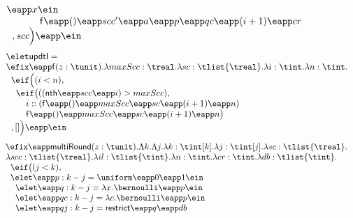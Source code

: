 \begin{figure}
\[\begin{array}{l}
                \eapp x \ein \\
 \hspace{1.2cm} \mathsf{f}  \eapp () \eapp scc' \eapp a \eapp p \eapp qc
                \eapp (i+1) \eapp  cr  \\ 
 \hspace{0.2cm} , scc  \Big ) \eapp \ein
\end{array}
\]
%
%
\[
\begin{array}{l}
\elet \mathsf{updtI} = \\
                 \efix \eapp  \mathsf{f}(z : \tunit). \lambda maxScc: \treal. 
                 \lambda sc: \tlist{\treal}. \lambda i: \tint. \lambda n: \tint. \\
 \hspace{.2cm}   \eif \Big (   (i < n)  ,  \\
 \hspace{0.4cm}  \eif \big( ( ( \mathsf{nth} \eapp scc \eapp i)  >  maxScc  ) ,       \\
 \hspace{0.8cm}  i :: ( \mathsf{f}  \eapp () \eapp maxScc \eapp sc
                 \eapp (i+1) \eapp n  )\\
 \hspace{0.8cm}  \mathsf{f}  \eapp () \eapp maxScc \eapp sc
                 \eapp (i+1) \eapp n  \big )  \\
 \hspace{0.2cm}  , [] \Big ) \eapp \ein
\end{array}
\]
%
%
\[
\begin{array}{l}
 \efix \eapp  \mathsf{multiRound}(z : \tunit). \Lambda k. \Lambda j. 
        \lambda k: \tint[k]. \lambda j: \tint[j]. \lambda sc: \tlist{\treal}.\\
        \lambda scc: \tlist{\treal}. \lambda il: \tlist{\tint}. \lambda n: \tint.
        \lambda cr: \tint. \lambda db: \tlist{\tint}.\\
 \hspace{.2cm}  \eif   \big (   (j < k)  ,  \\
 \hspace{.2cm}  \elet \eapp p: k - j = \uniform \eapp 0 \eapp 1 \ein \\
 \hspace{0.4cm} \elet \eapp q: k - j = \lambda x. \bernoulli \eapp p \ein \\
 \hspace{0.4cm} \elet \eapp qc: k - j = \lambda c. \bernoulli \eapp p \ein \\
 \hspace{0.4cm} \elet \eapp qj : k - j = \mathsf{restrict} \eapp q \eapp db\\

\end{array}\]
\end{figure}
